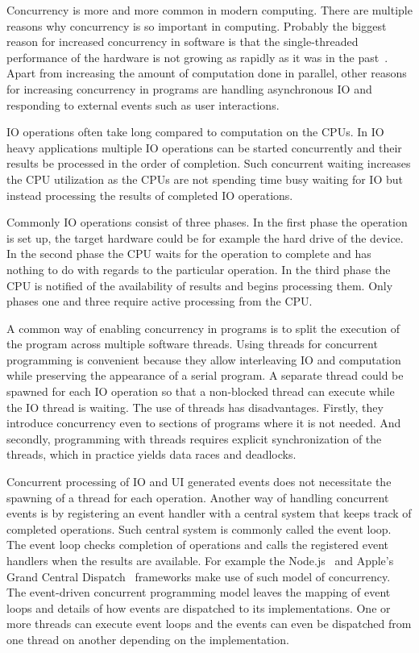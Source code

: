 Concurrency is more and more common in modern computing. There are multiple reasons why concurrency is so important in computing. Probably the biggest reason for increased concurrency in software is that the single-threaded performance of the hardware is not growing as rapidly as it was in the past~\cite{sutter2005free}. Apart from increasing the amount of computation done in parallel, other reasons for increasing concurrency in programs are handling asynchronous IO and responding to external events such as user interactions.

IO operations often take long compared to computation on the CPUs. In IO heavy applications multiple IO operations can be started concurrently and their results be processed in the order of completion. Such concurrent waiting increases the CPU utilization as the CPUs are not spending time busy waiting for IO but instead processing the results of completed IO operations.~\cite{dabek2002event}

Commonly IO operations consist of three phases. In the first phase the operation is set up, the target hardware could be for example the hard drive of the device. In the second phase the CPU waits for the operation to complete and has nothing to do with regards to the particular operation. In the third phase the CPU is notified of the availability of results and begins processing them. Only phases one and three require active processing from the CPU.~\cite{friesen2015asynchronous}

A common way of enabling concurrency in programs is to split the execution of the program across multiple software threads. Using threads for concurrent programming is convenient because they allow interleaving IO and computation while preserving the appearance of a serial program. A separate thread could be spawned for each IO operation so that a non-blocked thread can execute while the IO thread is waiting. The use of threads has disadvantages. Firstly, they introduce concurrency even to sections of programs where it is not needed. And secondly, programming with threads requires explicit synchronization of the threads, which in practice yields data races and deadlocks.~\cite{dabek2002event}

Concurrent processing of IO and UI generated events does not necessitate the spawning of a thread for each operation. Another way of handling concurrent events is by registering an event handler with a central system that keeps track of completed operations. Such central system is commonly called the event loop. The event loop checks completion of operations and calls the registered event handlers when the results are available. For example the Node.js~\cite{tilkov2010node} and Apple's Grand Central Dispatch~\cite{sakamoto2012grand} frameworks make use of such model of concurrency. The event-driven concurrent programming model leaves the mapping of event loops and details of how events are dispatched to its implementations. One or more threads can execute event loops and the events can even be dispatched from one thread on another depending on the implementation.

